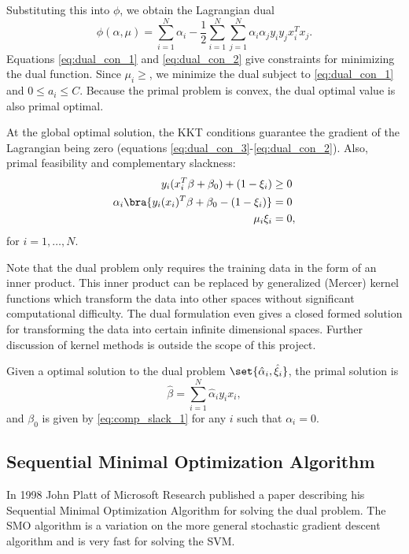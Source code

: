 \documentclass[10pt]{article}
\begin{document}
Substituting this into $\phi$, we obtain the Lagrangian dual 
\[
	\phi(\alpha,\mu)=\sum_{i=1}^{N}\alpha_{i}-\frac{1}{2}\sum_{i=1}^{N}\sum_{j=1}^{N}\alpha_{i}\alpha_{j}y_{i}y_{j}x_{i}^{T}x_{j}.
	\]
Equations \eqref{eq:dual_con_1} and \eqref{eq:dual_con_2} give constraints for minimizing the dual function. Since $\mu_{i}\geq$, we minimize the dual subject to
\eqref{eq:dual_con_1} and $0\leq a_{i}\leq C$. Because the primal problem is convex, the dual optimal value is also primal optimal. 

At the global optimal solution, the KKT conditions guarantee the gradient of the Lagrangian being zero (equations \eqref{eq:dual_con_3}-\eqref{eq:dual_con_2}). Also, primal feasibility and complementary slackness:
\begin{align}
	y_{i}(x_{i}^{T}\beta+\beta_{0})+(1-\xi_{i})&\geq 0\\
	\alpha_{i}\bra{y_{i}(x_{i})^{T}\beta+\beta_{0}-(1-\xi_{i})}&=0\label{eq:comp_slack_1}\\
	\mu_{i}\xi_{i}&=0,
\end{align}
for $i = 1,\ldots, N$. 

Note that the dual problem only requires the training data in the form of an inner product. This inner product can be replaced by generalized (Mercer) kernel functions which transform the data into other spaces without significant computational difficulty. The dual formulation even gives a closed formed solution for transforming the data into certain infinite dimensional spaces. Further discussion of kernel methods is outside the scope of this project.

Given a optimal solution to the dual problem $\set{\hat{\alpha}_{i},\hat{\xi}_{i}}$, the primal solution is
\[
	\hat{\beta}=\sum_{i=1}^{N}\hat{\alpha}_{i}y_{i}x_{i},
\]
and $\beta_{0}$ is given by \eqref{eq:comp_slack_1} for any $i$ such that $\alpha_{i}= 0$.

\subsection{Sequential Minimal Optimization Algorithm} %
\label{sec:smo_algorithm}
In 1998 John Platt of Microsoft Research published a paper  \cite{platt1998sequential} describing his Sequential Minimal Optimization Algorithm for solving the dual problem. The SMO algorithm is a variation on the more general stochastic gradient descent algorithm and is very fast for solving the SVM. 
\end{document}
